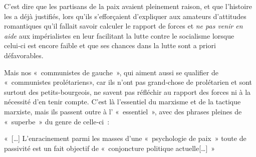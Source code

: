 \documentclass[french,twoside]{book} %
\def\mednobreak{\ifdim\lastskip<\medskipamount
  \removelastskip\nopagebreak\medskip\fi}
\newcommand{\labelblock}[1]{\medbreak{\noindent\color{rubric}\bfseries #1}\par\mednobreak}
\newenvironment{quoteblock}%
  {\begin{quoting}}
  {\end{quoting}}
\newenvironment{quotebar}{%
    \def\FrameCommand{{\color{rubric!10!}\vrule width 0.5em} \hspace{0.9em}}%
    \def\OuterFrameSep{\itemsep} %
    \MakeFramed {\advance\hsize-\width \FrameRestore}
  }%
  {%
    \endMakeFramed
  }
\renewenvironment{quoteblock}%
  {%
    \savenotes
    \setstretch{0.9}
    \normalfont
    \begin{quotebar}
  }
  {%
    \end{quotebar}
    \spewnotes
  }
\begin{document}
\labelblock{Qu'est‑ce à dire ?}

\noindent C'est dire que les partisans de la paix avaient pleinement raison, et que l’histoire les a déjà justifiés, lors qu’ils s’efforçaient d’expliquer aux amateurs d’attitudes romantiques qu’il fallait savoir calculer le rapport de forces et \emph{ne pas venir en aide} aux impérialistes en leur facilitant la lutte contre le socialisme lorsque celui‑ci est encore faible et que ses chances dans la lutte sont a priori défavorables.\par
Mais nos « communistes de gauche », qui aiment aussi se qualifier de « communistes prolétariens», car ils n’ont pas grand‑chose de prolétarien et sont surtout des petits-bourgeois, ne savent pas réfléchir au rapport des forces ni à la nécessité d’en tenir compte. C'est là l’essentiel du marxisme et de la tactique marxiste, mais ils passent outre à l’ « essentiel », avec des phrases pleines de « superbe » du genre de celle‑ci :\par

\begin{quoteblock}
 \noindent « […] L'enracinement parmi les masses d’une « psychologie de paix » toute de passivité est un fait objectif de « conjoncture politique actuelle[…] »
\end{quoteblock}
\end{document}
